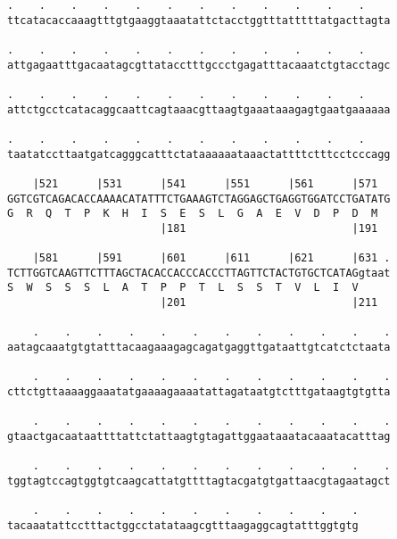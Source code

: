 \documentclass{article}
\begin{document}
\begin{Verbatim}
.    .    .    .    .    .    .    .    .    .    .    .    
ttcatacaccaaagtttgtgaaggtaaatattctacctggtttatttttatgacttagta
                                                            
.    .    .    .    .    .    .    .    .    .    .    .    
attgagaatttgacaatagcgttatacctttgccctgagatttacaaatctgtacctagc
                                                            
.    .    .    .    .    .    .    .    .    .    .    .    
attctgcctcatacaggcaattcagtaaacgttaagtgaaataaagagtgaatgaaaaaa
                                                            
.    .    .    .    .    .    .    .    .    .    .    .    
taatatccttaatgatcagggcatttctataaaaaataaactattttctttcctcccagg
                                                            
    |521      |531      |541      |551      |561      |571  
GGTCGTCAGACACCAAAACATATTTCTGAAAGTCTAGGAGCTGAGGTGGATCCTGATATG
G  R  Q  T  P  K  H  I  S  E  S  L  G  A  E  V  D  P  D  M  
                        |181                          |191  
  
    |581      |591      |601      |611      |621      |631 .
TCTTGGTCAAGTTCTTTAGCTACACCACCCACCCTTAGTTCTACTGTGCTCATAGgtaat
S  W  S  S  S  L  A  T  P  P  T  L  S  S  T  V  L  I  V     
                        |201                          |211  
  
    .    .    .    .    .    .    .    .    .    .    .    .
aatagcaaatgtgtatttacaagaaagagcagatgaggttgataattgtcatctctaata
                                                            
    .    .    .    .    .    .    .    .    .    .    .    .
cttctgttaaaaggaaatatgaaaagaaaatattagataatgtctttgataagtgtgtta
                                                            
    .    .    .    .    .    .    .    .    .    .    .    .
gtaactgacaataattttattctattaagtgtagattggaataaatacaaatacatttag
                                                            
    .    .    .    .    .    .    .    .    .    .    .    .
tggtagtccagtggtgtcaagcattatgttttagtacgatgtgattaacgtagaatagct
                                                            
    .    .    .    .    .    .    .    .    .    .    .
tacaaatattcctttactggcctatataagcgtttaagaggcagtatttggtgtg
                                                       
                                                       
 

\end{Verbatim}
\end{document}
